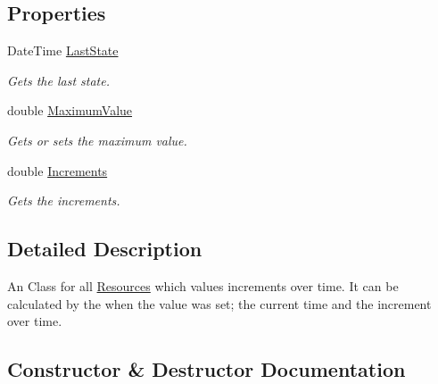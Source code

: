 \subsection*{Properties}
\begin{DoxyCompactItemize}
\item 
Date\+Time \hyperlink{classCore_1_1Models_1_1Resources_1_1IncrementalResource_a2aa8fc33796b301d8682f351e2cc0658}{Last\+State}
\begin{DoxyCompactList}\small\item\em Gets the last state. \end{DoxyCompactList}\item 
double \hyperlink{classCore_1_1Models_1_1Resources_1_1IncrementalResource_ad761090c40b93c8987b9ec3fc244c461}{Maximum\+Value}
\begin{DoxyCompactList}\small\item\em Gets or sets the maximum value. \end{DoxyCompactList}\item 
double \hyperlink{classCore_1_1Models_1_1Resources_1_1IncrementalResource_acbe6bfafc812c2fc407648f577978b95}{Increments}
\begin{DoxyCompactList}\small\item\em Gets the increments. \end{DoxyCompactList}\end{DoxyCompactItemize}


\subsection{Detailed Description}
An Class for all \hyperlink{namespaceCore_1_1Models_1_1Resources}{Resources} which values increments over time. It can be calculated by the when the value was set; the current time and the increment over time. 



\subsection{Constructor \& Destructor Documentation}
\hypertarget{classCore_1_1Models_1_1Resources_1_1IncrementalResource_a0531e13b786b186772f59c3e126fa3b8}{}
